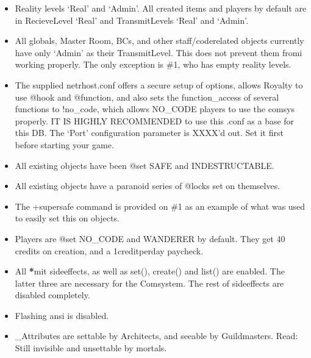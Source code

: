 \documentclass[letterpaper,10pt,english]{sphinxmanual}
\begin{document}
\begin{itemize}
\item {} 
\sphinxAtStartPar
Reality levels ‘Real’ and ‘Admin’.
All created items and players by default are in Recieve\sphinxhyphen{}Level ‘Real’ and
Transmit\sphinxhyphen{}Levels ‘Real’ and ‘Admin’.

\item {} 
\sphinxAtStartPar
All globals, Master Room, BCs\sphinxhyphen{}{\color{red}\bfseries{}*}, and other staff/code\sphinxhyphen{}related objects
currently have only ‘Admin’ as their Transmit\sphinxhyphen{}Level. This does not prevent
them fromi working properly. The only exception is \#1, who has empty reality
levels.

\item {} 
\sphinxAtStartPar
The supplied netrhost.conf offers a secure setup of options, allows Royalty
to use @hook and @function, and also sets the function\_access of several
functions to !no\_code, which allows NO\_CODE players to use the comsys
properly.
IT IS HIGHLY RECOMMENDED to use this .conf as a base for this DB.
The ‘Port’ configuration parameter is XXXX’d out. Set it first before starting
your game.

\item {} 
\sphinxAtStartPar
All existing objects have been @set SAFE and INDESTRUCTABLE.

\item {} 
\sphinxAtStartPar
All existing objects have a paranoid series of @locks set on themselves.

\item {} 
\sphinxAtStartPar
The +supersafe command is provided on \#1 as an example of what was used to
easily set this on objects.

\item {} 
\sphinxAtStartPar
Players are @set NO\_CODE and WANDERER by default. They get 40 credits on
creation, and a 1\sphinxhyphen{}credit\sphinxhyphen{}per\sphinxhyphen{}day paycheck.

\item {} 
\sphinxAtStartPar
All {\color{red}\bfseries{}*}mit sideeffects, as well as set(), create() and list() are enabled. The
latter three are necessary for the Comsystem. The rest of sideeffects are
disabled completely.

\item {} 
\sphinxAtStartPar
Flashing ansi is disabled.

\item {} 
\sphinxAtStartPar
\_Attributes are settable by Architects, and seeable by Guildmasters. Read:
Still invisible and unsettable by mortals.


\end{itemize}
\end{document}
